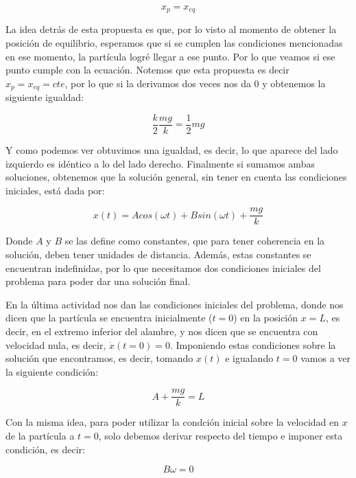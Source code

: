 \documentclass{article}
\begin{document}
\begin{equation}
    x_p = x_{eq}
\end{equation}

La idea detrás de esta propuesta es que, por lo visto al momento de obtener la posición de equilibrio, esperamos que si se cumplen las condiciones mencionadas en ese momento, la partícula logré llegar a ese punto. Por lo que veamos si ese punto cumple con la ecuación. Notemos que esta propuesta es decir $x_p = x_{eq} = cte$, por lo que si la derivamos dos veces nos da $0$ y obtenemos la siguiente igualdad:

\begin{equation}
    \frac{k}{2} \frac{mg}{k} = \frac{1}{2}mg
\end{equation}

Y como podemos ver obtuvimos una igualdad, es decir, lo que aparece del lado izquierdo es idéntico a lo del lado derecho. Finalmente si sumamos ambas soluciones, obtenemos que la solución general, sin tener en cuenta las condiciones iniciales, está dada por:

\begin{equation}
    x(t) = Acos(\omega t) + Bsin(\omega t) + \frac{mg}{k}
\end{equation}

Donde $A$ y $B$ se las define como constantes, que para tener coherencia en la solución, deben tener unidades de distancia. Además, estas constantes se encuentran indefinidas, por lo que necesitamos dos condiciones iniciales del problema para poder dar una solución final.

En la última actividad nos dan las condiciones iniciales del problema, donde nos dicen que la partícula se encuentra inicialmente ($t = 0$) en la posición $x = L$, es decir, en el extremo inferior del alambre, y nos dicen que se encuentra con velocidad nula, es decir, $\dot{x}(t = 0) = 0$. Imponiendo estas condiciones sobre la solución que encontramos, es decir, tomando $x(t)$ e igualando $t = 0$ vamos a ver la siguiente condición:

\begin{equation}
    A + \frac{mg}{k} = L
\end{equation}

Con la misma idea, para poder utilizar la condción inicial sobre la velocidad en $x$ de la partícula a $t= 0$, solo debemos derivar respecto del tiempo e imponer esta condición, es decir:

\begin{equation}
    B\omega = 0
\end{equation}
\end{document}
